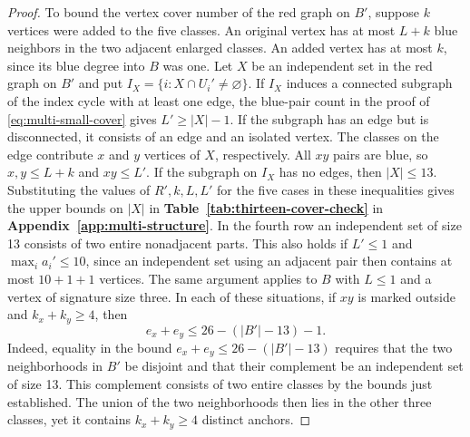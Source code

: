 \documentclass[preprint,11pt,numbers]{elsarticle-arxiv}
\numberwithin{equation}{section}
\theoremstyle{definition}
\begin{document}
\begin{proof}
To bound the vertex cover number of the red graph on $B'$,
suppose $k$ vertices were added to the five classes. An original
vertex has at most $L+k$ blue neighbors in the two adjacent
enlarged classes. An added vertex has at most $k$, since its
blue degree into $B$ was one. Let $X$ be an independent set
in the red graph on $B'$ and put $I_X=\{i:X\cap U_i'\ne
\varnothing\}$. If $I_X$ induces a connected subgraph of the
index cycle with at least one edge, the blue-pair count in the
proof of \eqref{eq:multi-small-cover} gives $L'\ge |X|-1$.
If the subgraph has an edge but is disconnected, it consists
of an edge and an isolated vertex. The classes on the edge
contribute $x$ and $y$ vertices of $X$, respectively. All
$xy$ pairs are blue, so $x,y\le L+k$ and $xy\le L'$. If the
subgraph on $I_X$ has no edges, then $|X|\le13$.
Substituting the values of $R',k,L,L'$ for the five cases in
these inequalities gives the upper bounds on $|X|$ in
\textbf{Table~\ref{tab:thirteen-cover-check}} in
\textbf{Appendix~\ref{app:multi-structure}}.
In the fourth row an independent set of size 13 consists of two entire
nonadjacent parts. This also
holds if $L'\le1$ and $\max_i a_i'\le10$, since an independent set
using an adjacent pair then contains at most $10+1+1$ vertices.
The same argument applies to $B$ with $L\le1$ and a vertex of
signature size three. In each of these situations, if $xy$ is marked
outside and $k_x+k_y\ge4$, then
\begin{equation}\label{eq:d13-improved-cover}
 e_x+e_y\le 26-(|B'|-13)-1.
\end{equation}
Indeed, equality in the bound $e_x+e_y\le26-(|B'|-13)$
requires that the two neighborhoods in $B'$ be disjoint and that
their complement be an independent set of size 13. This complement
consists of two entire classes by the bounds just established.
The union of the two neighborhoods then lies in the other three
classes, yet it contains $k_x+k_y\ge4$ distinct anchors.


\end{proof}
\end{document}
